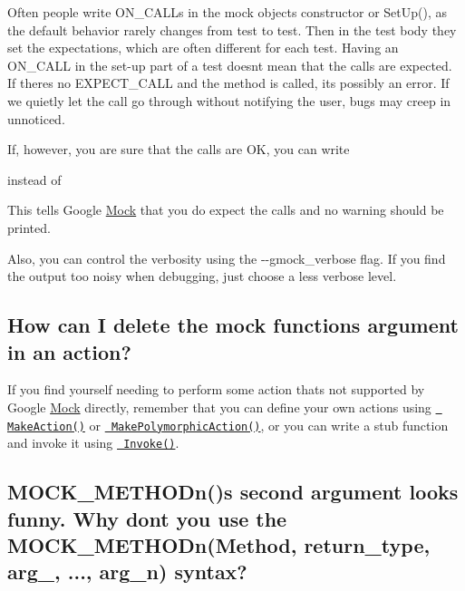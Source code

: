 Often people write {\ttfamily O\+N\+\_\+\+C\+A\+LL}s in the mock object\textquotesingle{}s constructor or {\ttfamily Set\+Up()}, as the default behavior rarely changes from test to test. Then in the test body they set the expectations, which are often different for each test. Having an {\ttfamily O\+N\+\_\+\+C\+A\+LL} in the set-\/up part of a test doesn\textquotesingle{}t mean that the calls are expected. If there\textquotesingle{}s no {\ttfamily E\+X\+P\+E\+C\+T\+\_\+\+C\+A\+LL} and the method is called, it\textquotesingle{}s possibly an error. If we quietly let the call go through without notifying the user, bugs may creep in unnoticed.

If, however, you are sure that the calls are OK, you can write


\begin{DoxyCode}{0}
\end{DoxyCode}


instead of


\begin{DoxyCode}{0}
\end{DoxyCode}


This tells Google \mbox{\hyperlink{class_mock}{Mock}} that you do expect the calls and no warning should be printed.

Also, you can control the verbosity using the {\ttfamily -\/-\/gmock\+\_\+verbose} flag. If you find the output too noisy when debugging, just choose a less verbose level.

\subsection*{How can I delete the mock function\textquotesingle{}s argument in an action?}

If you find yourself needing to perform some action that\textquotesingle{}s not supported by Google \mbox{\hyperlink{class_mock}{Mock}} directly, remember that you can define your own actions using \href{CookBook.md\#writing-new-actions}{\texttt{ Make\+Action()}} or \href{CookBook.md\#writing_new_polymorphic_actions}{\texttt{ Make\+Polymorphic\+Action()}}, or you can write a stub function and invoke it using \href{CookBook.md\#using-functions_methods_functors}{\texttt{ Invoke()}}.

\subsection*{M\+O\+C\+K\+\_\+\+M\+E\+T\+H\+O\+Dn()\textquotesingle{}s second argument looks funny. Why don\textquotesingle{}t you use the M\+O\+C\+K\+\_\+\+M\+E\+T\+H\+O\+Dn(\+Method, return\+\_\+type, arg\+\_, ..., arg\+\_\+n) syntax?}

